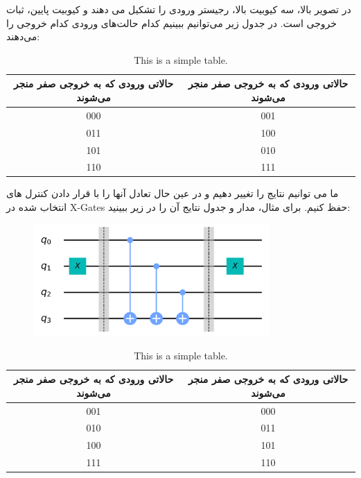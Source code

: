 \documentclass{book}
\begin{document}
در تصویر بالا، سه کیوبیت بالا، رجیستر ورودی را تشکیل می دهند و کیوبیت پایین، ثبات خروجی است. در جدول زیر می‌توانیم ببینیم کدام حالت‌های ورودی کدام خروجی را می‌دهند:
\begin{table}[h]
	\centering
	\begin{tabular}{|c|c|}
		\hline
		حالاتی ورودی که به خروجی صفر منجر می‌شوند &  حالاتی ورودی که به خروجی صفر منجر می‌شوند \\ \hline
		000 & 001 \\ \hline
		011 & 100 \\ \hline
		101 & 010 \\ \hline
		110 & 111 \\ \hline
	\end{tabular}
	\caption{This is a simple table.}
\end{table}
ما می توانیم نتایج را تغییر دهیم و در عین حال تعادل آنها را با قرار دادن کنترل های انتخاب شده در X-Gates حفظ کنیم. برای مثال، مدار و جدول نتایج آن را در زیر ببینید:
\begin{center}
	\begin{figure}[ht]
		\centering
		\includegraphics[width=0.8\textwidth]{oraclebalance.png}
		\caption{}
	\end{figure}
\end{center}


\begin{table}[h]
	\centering
	\begin{tabular}{|c|c|}
		\hline
		حالاتی ورودی که به خروجی صفر منجر می‌شوند &  حالاتی ورودی که به خروجی صفر منجر می‌شوند \\ \hline
		001 & 000 \\ \hline
		010 & 011 \\ \hline
		100 & 101 \\ \hline
		111 & 110 \\ \hline
	\end{tabular}
	\caption{This is a simple table.}
\end{table}
\end{document}
